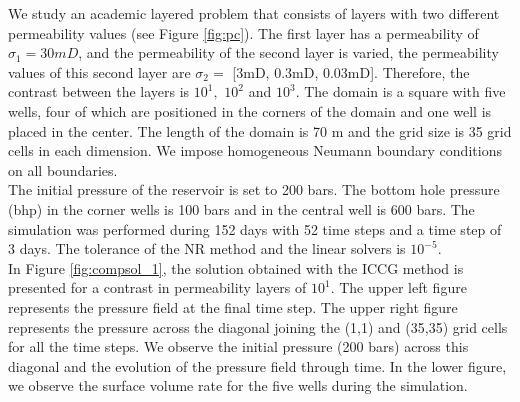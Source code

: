 \documentclass[review]{elsarticle}
\begin{document}
We study an academic layered problem that consists of layers with two different permeability values 
(see Figure \ref{fig:pc}). The first layer has a permeability of $\sigma_1 = 30mD$, and the permeability 
of the second layer is varied, the permeability values of this second layer are $\sigma_2 =$ [3mD, 0.3mD, 0.03mD]. Therefore, the contrast between the layers 
is $10^{1},$ $10^{2}$ and $10^{3}$.
The domain is a square with five wells, four of which are positioned in the corners of the domain and one 
well is placed in the center. The length of the domain is 70 m and the grid size is 35 grid cells in each dimension.  We impose homogeneous Neumann boundary conditions on all boundaries. \\
The initial pressure of the reservoir is set to 200 bars. The bottom hole pressure (bhp) in the corner wells is 100 bars and 
in the central well is 600 bars.  
The simulation was performed during 152 days with 52 time steps and a time step of 3 days. The tolerance of 
the NR method and the linear solvers is $10^{-5}$.\\
In Figure \ref{fig:compsol_1}, the solution obtained with the ICCG method is presented for a contrast in permeability layers of $10^{1}$. The upper left figure represents the pressure field at the final time step. The upper right 
figure represents the pressure across the diagonal joining the (1,1) and (35,35) grid cells for all the time steps. 
We observe the initial pressure (200 bars) across this diagonal and the evolution of the pressure field through time. 
In the lower figure, we observe the surface volume rate for the five wells during the simulation.
\end{document}
